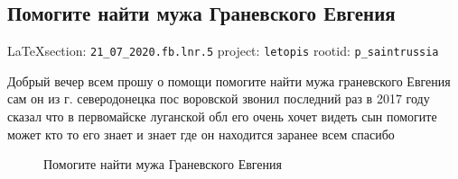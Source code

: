  
 
\subsection{Помогите найти мужа Граневского Евгения}
\label{sec:21_07_2020.fb.lnr.5}
  
\vspace{0.5cm}
{\small\LaTeX section: \verb|21_07_2020.fb.lnr.5| project: \verb|letopis| rootid: \verb|p_saintrussia|}
\vspace{0.5cm}
 
Добрый вечер всем прошу о помощи помогите найти мужа граневского Евгения сам он
из г. северодонецка пос воровской звонил последний раз в 2017 году сказал что в
первомайске луганской обл его очень хочет видеть сын помогите может кто то его
знает и знает где он находится заранее всем спасибо

\begin{figure}[ht]
 \centering
 \caption{Помогите найти мужа Граневского Евгения}
 \label{fig:}
\end{figure}

